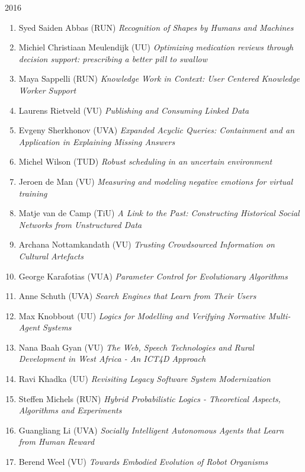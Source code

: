 \begin{multicols}{2}
\begin{scriptsize}
\vspace{0.2cm}
2016
\vspace{0.2cm}
\begin{enumerate}[leftmargin=*,noitemsep,topsep=0pt,parsep=1pt,partopsep=0pt]
\renewcommand{\labelenumi}{2016-\arabic{enumi}}
\item Syed Saiden Abbas (RUN) \textit{Recognition of Shapes by Humans and Machines
}\item Michiel Christiaan Meulendijk (UU) \textit{Optimizing medication reviews through decision support: prescribing a better pill to swallow
}\item Maya Sappelli (RUN) \textit{Knowledge Work in Context: User Centered Knowledge Worker Support
}\item Laurens Rietveld (VU) \textit{Publishing and Consuming Linked Data
}\item Evgeny Sherkhonov (UVA) \textit{Expanded Acyclic Queries: Containment and an Application in Explaining Missing Answers
}\item Michel Wilson (TUD) \textit{Robust scheduling in an uncertain environment
}\item Jeroen de Man (VU) \textit{Measuring and modeling negative emotions for virtual training
}\item Matje van de Camp (TiU) \textit{A Link to the Past: Constructing Historical Social Networks from Unstructured Data
}\item Archana Nottamkandath (VU) \textit{Trusting Crowdsourced Information on Cultural Artefacts
}\item George Karafotias (VUA) \textit{Parameter Control for Evolutionary Algorithms
}\item Anne Schuth (UVA) \textit{Search Engines that Learn from Their Users
}\item Max Knobbout (UU) \textit{Logics for Modelling and Verifying Normative Multi-Agent Systems
}\item Nana Baah Gyan (VU) \textit{The Web, Speech Technologies and Rural Development in West Africa - An ICT4D Approach
}\item Ravi Khadka (UU) \textit{Revisiting Legacy Software System Modernization
}\item Steffen Michels (RUN) \textit{Hybrid Probabilistic Logics - Theoretical Aspects, Algorithms and Experiments
}\item Guangliang Li (UVA) \textit{Socially Intelligent Autonomous Agents that Learn from Human Reward
}\item Berend Weel (VU) \textit{Towards Embodied Evolution of Robot Organisms
}
\end{enumerate}
\end{scriptsize}
\end{multicols}
